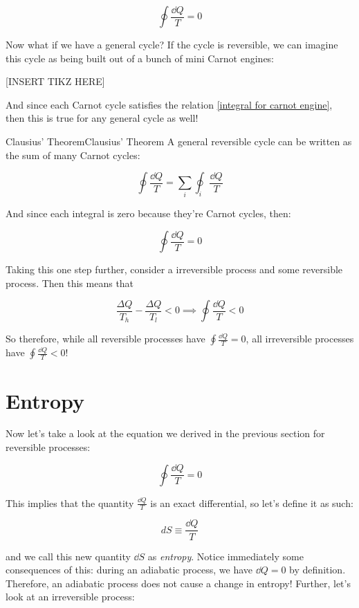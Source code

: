     \begin{equation}\label{integral for carnot engine}
      \oint \frac{\dd Q}{T} = 0
    \end{equation} 

    Now what if we have a general cycle? If the cycle is reversible, we can imagine this cycle as being built out of a bunch of mini Carnot engines:

    [INSERT TIKZ HERE] 

    And since each Carnot cycle satisfies the relation \ref{integral for carnot engine}, then this is true for any general cycle as well!

    \begin{theorem}{Clausius' Theorem}{Clausius' Theorem}
      A general reversible cycle can be written as the sum of many Carnot cycles: 

      \[ \oint \frac{\dd Q}{T} = \sum_i \oint_i \frac{\dd Q}{T}\]

      And since each integral is zero because they're Carnot cycles, then:

      \[ \oint \frac{\dd Q}{T} = 0\]
    \end{theorem}

    Taking this one step further, consider a irreversible process and some reversible process. Then this means that 

    \[ \frac{\Delta Q}{T_h} - \frac{\Delta Q}{T_l} < 0 \implies \oint \frac{\dd Q}{T} < 0\]

    So therefore, while all reversible processes have $\oint \frac{\dd Q}{T} = 0$, all irreversible processes have $\oint \frac{\dd Q}{T} < 0$!

    \section{Entropy}

    Now let's take a look at the equation we derived in the previous section for reversible processes:

    \[ \oint \frac{\dd Q}{T} = 0\] 

    This implies that the quantity $\frac{\dd Q}{T}$ is an exact differential, so let's define it as such:

    \[ dS \equiv \frac{\dd Q}{T}\] 

    and we call this new quantity $\dd S$ as \textit{entropy}. Notice immediately some consequences of this: during an adiabatic process, we have $\dd Q = 0$ by definition. Therefore, an adiabatic process does not cause a change in entropy! Further, let's look at an irreversible process: 

